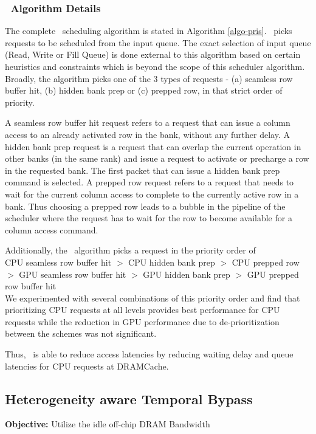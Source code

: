 \subsubsection{\prioname\ Algorithm Details}
\par The complete \prioname\ scheduling algorithm is stated in Algorithm \ref{algo-pris}. \prioname\ picks requests to be scheduled from the input queue. The exact selection of input queue (Read, Write or Fill Queue) is done external to this algorithm based on certain heuristics and constraints which is beyond the scope of this scheduler algorithm. Broadly, the algorithm picks one of the 3 types of requests - (a) seamless row buffer hit, (b) hidden bank prep or (c) prepped row, in that strict order of priority. 
\par A seamless row buffer hit request refers to a request that can issue a column access to an already activated row in the bank, without any further delay. A hidden bank prep request is a request that can overlap the current operation in other banks (in the same rank) and issue a request to activate or precharge a row in the requested bank. The first packet that can issue a hidden bank prep command is selected. A prepped row request refers to a request that needs to wait for the current column access to complete to the currently active row in a bank. Thus choosing a prepped row leads to a bubble in the pipeline of the scheduler where the request has to wait for the row to become available for a column access command.

\par Additionally, the \prioname\ algorithm picks a request in the priority order of \\
CPU seamless row buffer hit $>$ CPU hidden bank prep $>$ CPU prepped row $>$ GPU seamless row buffer hit $>$ GPU hidden bank prep $>$ GPU prepped row buffer hit\\ 
We experimented with several combinations of this priority order and find that prioritizing CPU requests at all levels provides best performance for CPU requests while the reduction in GPU performance due to de-prioritization between the schemes was not significant.
\par Thus, \prioname\ is able to reduce access latencies by reducing waiting delay and queue latencies for CPU requests at DRAMCache.



\subsection{Heterogeneity aware Temporal Bypass} \label{mechanism-bye}
\textbf{Objective:} Utilize the idle off-chip DRAM Bandwidth
